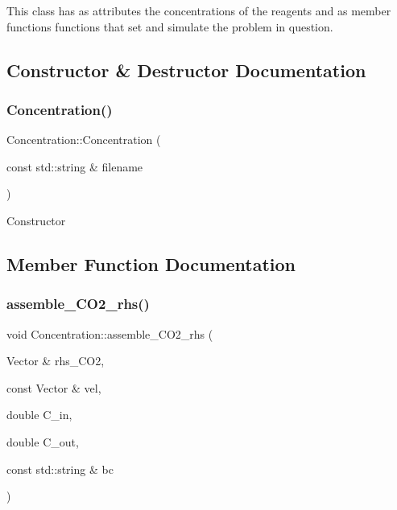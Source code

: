 This class has as attributes the concentrations of the reagents and as member functions functions that set and simulate the problem in question. 

\subsection{Constructor \& Destructor Documentation}
\mbox{\label{classConcentration_aacf470262d170239e4c69a3c728c3250}} 
\subsubsection{\texorpdfstring{Concentration()}{Concentration()}}
{\footnotesize\ttfamily Concentration\+::\+Concentration (\begin{DoxyParamCaption}\item[{const std\+::string \&}]{filename }\end{DoxyParamCaption})}

Constructor 

\subsection{Member Function Documentation}
\mbox{\label{classConcentration_a73fae4bed15fcf3c0296d7220c4f2e53}} 
\subsubsection{\texorpdfstring{assemble\+\_\+\+C\+O2\+\_\+rhs()}{assemble\_CO2\_rhs()}}
{\footnotesize\ttfamily void Concentration\+::assemble\+\_\+\+C\+O2\+\_\+rhs (\begin{DoxyParamCaption}\item[{Vector \&}]{rhs\+\_\+\+C\+O2,  }\item[{const Vector \&}]{vel,  }\item[{double}]{C\+\_\+in,  }\item[{double}]{C\+\_\+out,  }\item[{const std\+::string \&}]{bc }\end{DoxyParamCaption})}

